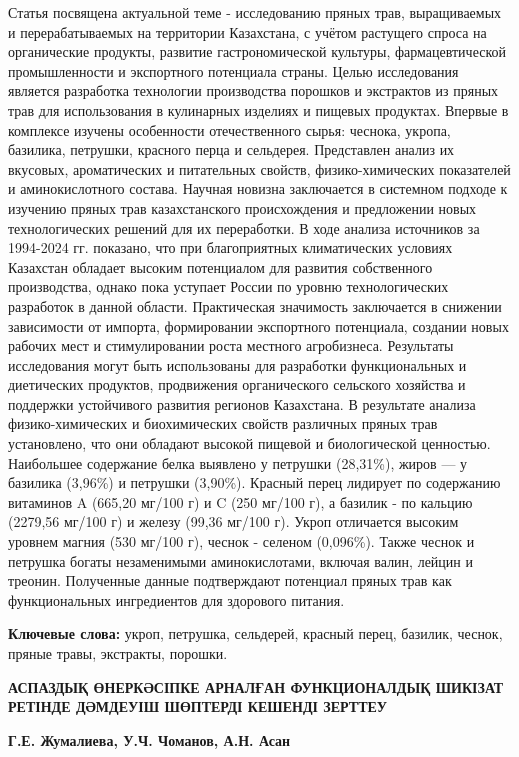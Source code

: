 Статья посвящена актуальной теме - исследованию пряных трав,
выращиваемых и перерабатываемых на территории Казахстана, с учётом
растущего спроса на органические продукты, развитие гастрономической
культуры, фармацевтической промышленности и экспортного потенциала
страны. Целью исследования является разработка технологии производства
порошков и экстрактов из пряных трав для использования в кулинарных
изделиях и пищевых продуктах. Впервые в комплексе изучены особенности
отечественного сырья: чеснока, укропа, базилика, петрушки, красного
перца и сельдерея. Представлен анализ их вкусовых, ароматических и
питательных свойств, физико-химических показателей и аминокислотного
состава. Научная новизна заключается в системном подходе к изучению
пряных трав казахстанского происхождения и предложении новых
технологических решений для их переработки. В ходе анализа источников за
1994-2024 гг. показано, что при благоприятных климатических условиях
Казахстан обладает высоким потенциалом для развития собственного
производства, однако пока уступает России по уровню технологических
разработок в данной области. Практическая значимость заключается в
снижении зависимости от импорта, формировании экспортного потенциала,
создании новых рабочих мест и стимулировании роста местного агробизнеса.
Результаты исследования могут быть использованы для разработки
функциональных и диетических продуктов, продвижения органического
сельского хозяйства и поддержки устойчивого развития регионов
Казахстана. В результате анализа физико-химических и биохимических
свойств различных пряных трав установлено, что они обладают высокой
пищевой и биологической ценностью. Наибольшее содержание белка выявлено
у петрушки (28,31\%), жиров --- у базилика (3,96\%) и петрушки (3,90\%).
Красный перец лидирует по содержанию витаминов A (665,20 мг/100 г) и C
(250 мг/100 г), а базилик - по кальцию (2279,56 мг/100 г) и железу
(99,36 мг/100 г). Укроп отличается высоким уровнем магния (530 мг/100
г), чеснок - селеном (0,096\%). Также чеснок и петрушка богаты
незаменимыми аминокислотами, включая валин, лейцин и треонин. Полученные
данные подтверждают потенциал пряных трав как функциональных
ингредиентов для здорового питания.

{\bfseries Ключевые слова:} укроп, петрушка, сельдерей, красный перец,
базилик, чеснок, пряные травы, экстракты, порошки.

\begin{articleheader}
{\bfseries АСПАЗДЫҚ ӨНЕРКӘСІПКЕ АРНАЛҒАН ФУНКЦИОНАЛДЫҚ ШИКІЗАТ РЕТІНДЕ
ДӘМДЕУІШ ШӨПТЕРДІ КЕШЕНДІ ЗЕРТТЕУ}

{\bfseries
Г.Е. Жумалиева\textsuperscript{\envelope },
У.Ч. Чоманов,
А.Н. Асан\textsuperscript{\envelope }
}
\end{articleheader}


